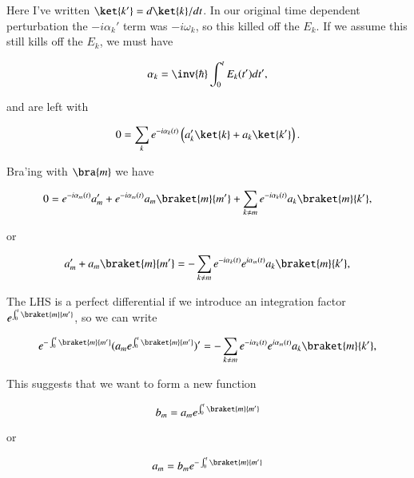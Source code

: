 Here I've written $\ket{k'} = d\ket{k}/dt$.  In our original time dependent perturbation the $-i \alpha_k'$ term was $-i \omega_k$, so this killed off the $E_k$.  If we assume this still kills off the $E_k$, we must have

\begin{equation}\label{eqn:oneMoreAdiabatic:80}
\alpha_k = \inv{\hbar} \int_0^t E_k(t') dt',
\end{equation}

and are left with

\begin{equation}\label{eqn:oneMoreAdiabatic:90}
0
=
\sum_k e^{-i \alpha_k(t)} 
\left( 
a_k' \ket{k}
+
a_k \ket{k'}
\right).
\end{equation}

Bra'ing with $\bra{m}$ we have

\begin{equation}\label{eqn:oneMoreAdiabatic:100}
0
=
e^{-i \alpha_m(t)} 
a_m' 
+
e^{-i \alpha_m(t)} 
a_m \braket{m}{m'}
+
\sum_{k \ne m} e^{-i \alpha_k(t)} 
a_k \braket{m}{k'},
\end{equation}

or

\begin{equation}\label{eqn:oneMoreAdiabatic:110}
a_m' 
+
a_m \braket{m}{m'}
=
-
\sum_{k \ne m} e^{-i \alpha_k(t)} e^{i \alpha_m(t)} 
a_k \braket{m}{k'},
\end{equation}

The LHS is a perfect differential if we introduce an integration factor $e^{\int_0^t \braket{m}{m'}}$, so we can write

\begin{equation}\label{eqn:oneMoreAdiabatic:130}
e^{-\int_0^t \braket{m}{m'}} ( a_m e^{\int_0^t \braket{m}{m'} } )'
=
-
\sum_{k \ne m} e^{-i \alpha_k(t)} e^{i \alpha_m(t)} 
a_k \braket{m}{k'},
\end{equation}

This suggests that we want to form a new function

\begin{equation}\label{eqn:oneMoreAdiabatic:150}
b_m = a_m e^{\int_0^t \braket{m}{m'} } 
\end{equation}

or

\begin{equation}\label{eqn:oneMoreAdiabatic:170}
a_m = b_m e^{-\int_0^t \braket{m}{m'} } 
\end{equation}

